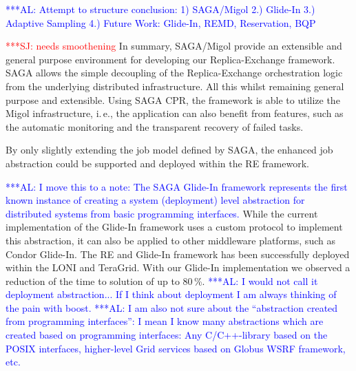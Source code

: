 \documentclass{rspublic}
\newcommand{\alnote}[1]{ {\textcolor{blue} { ***AL: #1 }}}
\newcommand{\jhanote}[1]{ {\textcolor{red} { ***SJ: #1 }}}
\newcommand{\alnote}[1]{}
\newcommand{\jhanote}[1]{}
\newcommand{\glidein}[1]{Glide-In }
\begin{document}
{%

                    
\alnote{Attempt to structure conclusion:
1) SAGA/Migol 2.) Glide-In 3.) Adaptive Sampling 4.) Future Work: Glide-In, REMD, Reservation, BQP}
                                         
\jhanote{needs smoothening} In summary, SAGA/Migol provide an extensible and
general purpose environment for developing our Replica-Exchange framework.
SAGA allows the simple decoupling of the Replica-Exchange orchestration 
logic from the underlying distributed infrastructure. All this whilst remaining
general purpose and extensible. Using SAGA CPR, the framework is able
to utilize the Migol infrastructure, i.\,e., the application can 
also benefit from features, such as the automatic monitoring and the transparent 
recovery of failed tasks.  

By only slightly extending the job model defined by SAGA, the enhanced job
abstraction could be supported and deployed within the RE framework.  


\alnote{I move this to a note:
The SAGA \glidein\ framework represents the first known instance of creating a
system (deployment) level abstraction for distributed systems from
basic programming interfaces.} 
While the current implementation of the Glide-In framework uses 
a custom protocol to implement this abstraction, it can also be applied 
to other middleware platforms, such as Condor Glide-In. The RE and 
Glide-In framework has been successfully deployed within 
the LONI and TeraGrid. With our Glide-In implementation we observed 
a reduction of the time to solution of up to 80\,\%.  
\alnote{I would not call it deployment abstraction... If I think about
deployment I am always thinking of the pain with boost.}
\alnote{I am also not sure about the ``abstraction created from 
  programming interfaces'': 
  I mean I know many abstractions which are created based on
  programming interfaces: Any C/C++-library based on the POSIX
  interfaces, higher-level Grid services based on Globus WSRF
  framework, etc.}   

}
\end{document}

